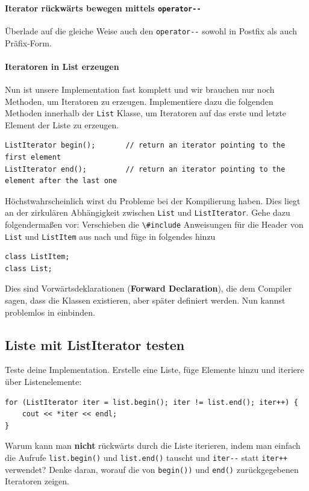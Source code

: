 \paragraph{Iterator rückwärts bewegen mittels \lstinline{operator--}}
Überlade auf die gleiche Weise auch den \lstinline{operator--} sowohl in Postfix als auch Präfix-Form.

\paragraph{Iteratoren in List erzeugen} 
Nun ist unsere Implementation fast komplett und wir brauchen nur noch Methoden, um Iteratoren zu erzeugen.
Implementiere dazu die folgenden Methoden innerhalb der \lstinline{List} Klasse, um Iteratoren auf das erste und letzte Element der Liste zu erzeugen.
\begin{lstlisting}
ListIterator begin();		// return an iterator pointing to the first element
ListIterator end();			// return an iterator pointing to the element after the last one
\end{lstlisting}

Höchstwahrscheinlich wirst du Probleme bei der Kompilierung haben.
Dies liegt an der zirkulären Abhängigkeit zwischen \lstinline{List} und \lstinline{ListIterator}.
Gehe dazu folgendermaßen vor:
Verschieben die \lstinline{\#include} Anweisungen für die Header von \lstinline{List} und \lstinline{ListItem} aus  nach  und füge in  folgendes hinzu

\begin{lstlisting}
class ListItem;
class List;
\end{lstlisting}

Dies sind Vorwärtsdeklarationen (\textbf{Forward Declaration}), die dem Compiler sagen, dass die Klassen existieren, aber später definiert werden. Nun kannst problemlos  in  einbinden.

\subsection{Liste mit ListIterator testen}
Teste deine Implementation.
Erstelle eine Liste, füge Elemente hinzu und iteriere über Listenelemente:

\begin{lstlisting}
for (ListIterator iter = list.begin(); iter != list.end(); iter++) {
	cout << *iter << endl;
}
\end{lstlisting}

Warum kann man \textbf{nicht} rückwärts durch die Liste iterieren, indem man einfach die Aufrufe \lstinline{list.begin()} und \lstinline{list.end()} tauscht und \lstinline{iter--} statt \lstinline{iter++} verwendet?
Denke daran, worauf die von \lstinline{begin())} und \lstinline{end()} zurückgegebenen Iteratoren zeigen.

